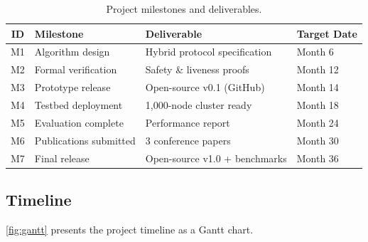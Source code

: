 \documentclass[
    language=english,
    doctype=grant-proposal,
    institution=none,
]{../../omnilatex}
\begin{document}
\begin{table}[htbp]
    \centering
    \caption{Project milestones and deliverables.}
    \label{tab:milestones}
    \begin{tabular}{@{}clll@{}}
        \toprule
        \textbf{ID} & \textbf{Milestone} & \textbf{Deliverable} &
        \textbf{Target Date} \\
        \midrule
        M1 & Algorithm design      & Hybrid protocol specification   & Month 6  \\
        M2 & Formal verification   & Safety \& liveness proofs       & Month 12 \\
        M3 & Prototype release     & Open-source v0.1 (GitHub)       & Month 14 \\
        M4 & Testbed deployment    & 1{,}000-node cluster ready     & Month 18 \\
        M5 & Evaluation complete   & Performance report              & Month 24 \\
        M6 & Publications submitted & 3 conference papers            & Month 30 \\
        M7 & Final release         & Open-source v1.0 + benchmarks   & Month 36 \\
        \bottomrule
    \end{tabular}
\end{table}

\subsection{Timeline}
\cref{fig:gantt} presents the project timeline as a Gantt chart.
\end{document}
